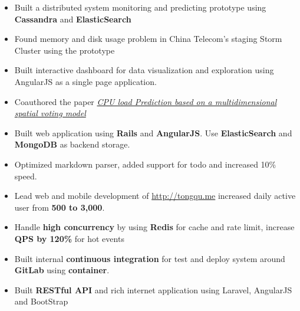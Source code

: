\documentclass[10pt, letterpaper]{simple-cv}
\begin{document}
\begin{itemize}
\item Built a distributed system monitoring and predicting prototype using \textbf{Cassandra} and \textbf{ElasticSearch}
\item Found memory and disk usage problem in China Telecom's staging Storm Cluster using the prototype
\item Built interactive dashboard for data visualization and exploration using AngularJS as a single page application.
\item Coauthored the paper \textit{\href{https://at15.github.io/pub/cpu_load_prediction.pdf}{CPU load Prediction based on a multidimensional spatial voting model}}
\end{itemize}

\begin{itemize}
\item Built web application using \textbf{Rails} and \textbf{AngularJS}. Use \textbf{ElasticSearch} and \textbf{MongoDB} as backend storage.
\item Optimized markdown parser, added support for todo and increased 10\% speed.
\end{itemize}

\begin{itemize}
\item Lead web and mobile development of \url{http://tongqu.me} increased daily active user from \textbf{500 to 3,000}.
\item Handle \textbf{high concurrency} by using \textbf{Redis} for cache and rate limit, increase \textbf{QPS by 120\%} for hot events
\item Built internal \textbf{continuous integration} for test and deploy system around \textbf{GitLab} using \textbf{container}.
\item Built \textbf{RESTful API} and rich internet application using Laravel, AngularJS and BootStrap
\end{itemize}
\end{document}
